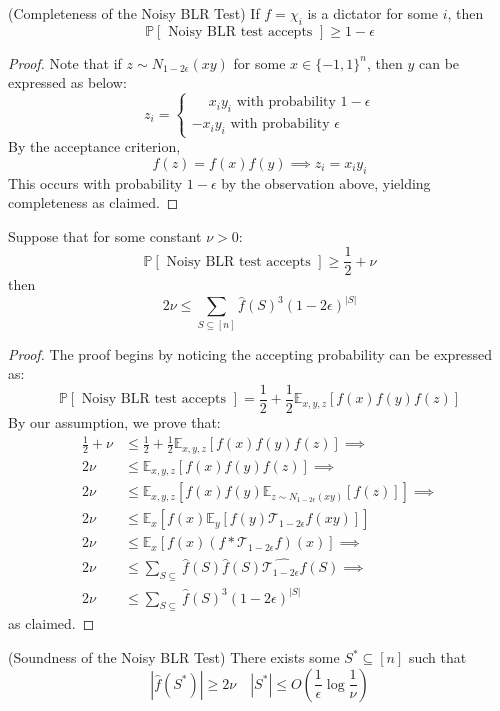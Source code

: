 \begin{lemma} (Completeness of the Noisy BLR Test)
 If $f = \chi_{i}$ is a dictator for some $i$, then
  \[ \mathbb{P}[\text{ Noisy BLR test accepts }] \geq 1 - \epsilon \]
\end{lemma}
\begin{proof}
  Note that if $z \sim N_{1-2\epsilon}(xy)$ for some $x \in \{-1,1\}^n$, then $y$ can be expressed as below:
  \begin{equation}
    z_i = \begin{cases}
             \phantom{-} x_iy_i \text{ with probability } 1- \epsilon \\
             - x_iy_i \text{ with probability } \epsilon
          \end{cases}
  \end{equation}
  By the acceptance criterion,
  \[ f(z) = f(x)f(y) \implies z_i = x_iy_i \]
  This occurs with probability $1- \epsilon$ by the observation above, yielding completeness as claimed.
\end{proof}
%
%
\begin{lemma} Suppose that for some constant $\nu > 0$:
\begin{equation*}
  \mathbb{P}[\text{ Noisy BLR test accepts }] \geq \frac{1}{2} + \nu
\end{equation*} then
\begin{equation}
  2\nu \leq \sum_{S \subseteq [n]} \hat{f}(S)^3(1-2\epsilon)^{|S|}
\end{equation}
\end{lemma}
%
\begin{proof}
  The proof begins by noticing the accepting probability can be expressed as:
  \[ \mathbb{P}[\text{ Noisy BLR test accepts }] = \frac{1}{2} + \frac{1}{2}\mathbb{E}_{x,y,z} \left[f(x)f(y)f(z) \right] \]
  By our assumption, we prove that:
  \begin{align*}
    \frac{1}{2} + \nu & \leq \frac{1}{2} + \frac{1}{2}\mathbb{E}_{x,y,z} \left[f(x)f(y)f(z) \right] \implies \\[0.7ex]
    2\nu & \leq \mathbb{E}_{x,y,z} \left[f(x)f(y)f(z) \right] \implies \\[0.7ex]
    2\nu & \leq\mathbb{E}_{x,y,z} \left[f(x)f(y) \mathbb{E}_{z \sim N_{1 - 2\epsilon}(xy)} \left[f(z)\right]\right] \implies \\[0.7ex]
    2\nu & \leq \mathbb{E}_{x}\left[ f(x)\mathbb{E}_{y}\left[ f(y)\mathcal{T}_{1-2\epsilon}f(xy)\right]\right] \\[0.7ex]
    2\nu & \leq \mathbb{E}_{x}\left[ f(x) (f * \mathcal{T}_{1-2\epsilon}f)(x)\right] \implies\\[0.7ex]
    2\nu & \leq \sum_{S \subseteq} \widehat{f}(S)\widehat{f}(S)\widehat{\mathcal{T}_{1-2\epsilon}f}(S) \implies \\[0.7ex]
    2\nu & \leq  \sum_{S \subseteq} \widehat{f}(S)^3 (1-2\epsilon)^{|S|}
  \end{align*}
  as claimed.
\end{proof}
%
\begin{corollary}
  (Soundness of the Noisy BLR Test) There exists some $S^* \subseteq [n]$ such that
  \begin{equation}
    |\widehat{f}(S^*)| \geq 2\nu \quad |S^*| \leq O\left(\frac{1}{\epsilon}\log{\frac{1}{\nu}}\right)
  \end{equation}
\end{corollary}
